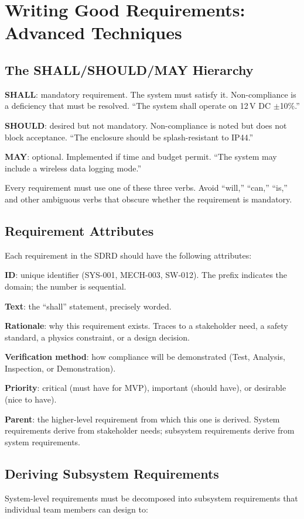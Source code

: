 \documentclass[11pt,letterpaper,twoside,openany]{book}
\begin{document}
\section{Writing Good Requirements: Advanced Techniques}
\subsection{The SHALL/SHOULD/MAY Hierarchy}
\textbf{SHALL}: mandatory requirement. The system must satisfy it. Non-compliance is a deficiency that must be resolved. ``The system shall operate on 12\,V DC $\pm$10\%.''

\textbf{SHOULD}: desired but not mandatory. Non-compliance is noted but does not block acceptance. ``The enclosure should be splash-resistant to IP44.''

\textbf{MAY}: optional. Implemented if time and budget permit. ``The system may include a wireless data logging mode.''

Every requirement must use one of these three verbs. Avoid ``will,'' ``can,'' ``is,'' and other ambiguous verbs that obscure whether the requirement is mandatory.

\subsection{Requirement Attributes}
Each requirement in the SDRD should have the following attributes:

\textbf{ID}: unique identifier (SYS-001, MECH-003, SW-012). The prefix indicates the domain; the number is sequential.

\textbf{Text}: the ``shall'' statement, precisely worded.

\textbf{Rationale}: why this requirement exists. Traces to a stakeholder need, a safety standard, a physics constraint, or a design decision.

\textbf{Verification method}: how compliance will be demonstrated (Test, Analysis, Inspection, or Demonstration).

\textbf{Priority}: critical (must have for MVP), important (should have), or desirable (nice to have).

\textbf{Parent}: the higher-level requirement from which this one is derived. System requirements derive from stakeholder needs; subsystem requirements derive from system requirements.

\subsection{Deriving Subsystem Requirements}
System-level requirements must be decomposed into subsystem requirements that individual team members can design to:
\end{document}
